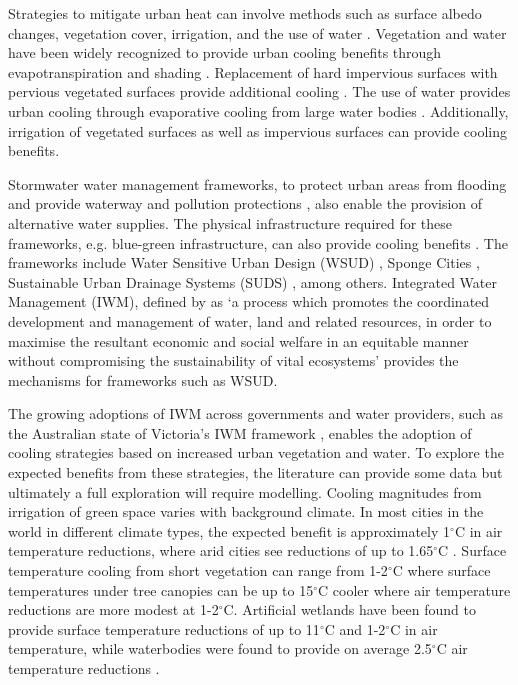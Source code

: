 \documentclass[utf8]{frontiersSCNS} %
\begin{document}
Strategies to mitigate urban heat can involve methods such as surface albedo changes, vegetation cover, irrigation, and the use of water \citep{Krayenhoff2021}. Vegetation and water have been widely recognized to provide urban cooling benefits through evapotranspiration and shading \citep{Bowler2010,Coutts2012,Coutts2015}. Replacement of hard impervious surfaces with pervious vegetated surfaces provide additional cooling \citep{Middel2019a}. The use of water provides urban cooling through evaporative cooling from large water bodies \citep{Theeuwes2013,Volker2013}. Additionally, irrigation of vegetated surfaces \citep{Broadbent2017a,Cheung2021} as well as impervious surfaces \citep{Hendel2016,Solcerova2018} can provide cooling benefits.

Stormwater water management frameworks, to protect urban areas from flooding and provide waterway and pollution protections \citep{Whiteoak2019b,Renouf2020a}, also enable the provision of alternative water supplies. The physical infrastructure required for these frameworks, e.g. blue-green infrastructure, can also provide cooling benefits \citep{Jamei2019,Probst2022}. The frameworks include  Water Sensitive Urban Design (WSUD) \citep{Wong2009,Newton2020}, Sponge Cities \citep{Jia2020}, Sustainable Urban Drainage Systems (SUDS) \citep{Woods-Ballard2007}, among others. Integrated Water Management (IWM), defined by \cite{GWP2000} as `a process which promotes the coordinated development and management of water, land and related resources, in order to maximise the resultant economic and social welfare in an equitable manner without compromising the sustainability of vital ecosystems' provides the mechanisms for frameworks such as WSUD.

The growing adoptions of IWM across governments and water providers, such as the Australian state of Victoria's IWM framework \citep{VIC_DELWP2017}, enables the adoption of cooling strategies based on increased urban vegetation and water. To explore the expected benefits from these strategies, the literature can provide some data but ultimately a full exploration will require modelling. Cooling magnitudes from irrigation of green space varies with background climate. In most cities in the world in different climate types, the expected benefit is approximately 1$^{\circ}$C in air temperature reductions, where arid cities see reductions of up to 1.65$^{\circ}$C \citep{Cheung2021}. Surface temperature cooling from short vegetation \citep{Santamouris2017,Yang2020} can range from 1-2$^{\circ}$C where surface temperatures under tree canopies \citep{Shashua-Bar2000,Cheung2018,Jia2021} can be up to 15$^{\circ}$C cooler where air temperature reductions are more modest at 1-2$^{\circ}$C. Artificial wetlands have been found to provide surface temperature reductions of up to 11$^{\circ}$C and 1-2$^{\circ}$C in air temperature, while waterbodies were found to provide on average 2.5$^{\circ}$C air temperature reductions \citep{Theeuwes2013,Volker2013,Manteghi2015,Broadbent2017a}.
\end{document}
